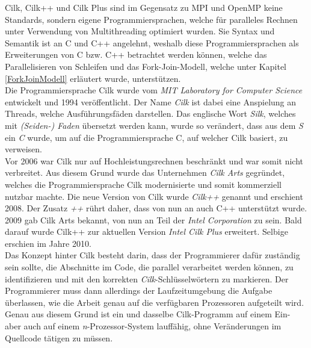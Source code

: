 			Cilk, Cilk++ und Cilk Plus sind im Gegensatz zu MPI und OpenMP keine Standards, sondern eigene Programmiersprachen, welche für paralleles Rechnen unter Verwendung von Multithreading optimiert wurden. Sie Syntax und Semantik ist an C und C++ angelehnt, weshalb diese Programmiersprachen als Erweiterungen von C bzw. C++ betrachtet werden können, welche das Parallelisieren von Schleifen und das Fork-Join-Modell, welche unter Kapitel \ref{ForkJoinModell} erläutert wurde, unterstützen.\\
			Die Programmiersprache Cilk wurde vom \textit{MIT Laboratory for Computer Science} entwickelt und 1994 veröffentlicht. Der Name \textit{Cilk} ist dabei eine Anspielung an Threads, welche Ausführungsfäden darstellen. Das englische Wort \textit{Silk}, welches mit \textit{(Seiden-) Faden} übersetzt werden kann, wurde so verändert, dass aus dem \textit{S} ein \textit{C} wurde, um auf die Programmiersprache C, auf welcher Cilk basiert, zu verweisen.\\
			Vor 2006 war Cilk nur auf Hochleistungsrechnen beschränkt und war somit nicht verbreitet. Aus diesem Grund wurde das Unternehmen \textit{Cilk Arts} gegründet, welches die Programmiersprache Cilk modernisierte und somit kommerziell nutzbar machte. Die neue Version von Cilk wurde \textit{Cilk++} genannt und erschient 2008. Der Zusatz \textit{++} rührt daher, dass von nun an auch C++ unterstützt wurde.\\
			2009 gab Cilk Arts bekannt, von nun an Teil der \textit{Intel Corporation} zu sein. Bald darauf wurde Cilk++ zur aktuellen Version \textit{Intel Cilk Plus} erweitert. Selbige erschien im Jahre 2010.\\
			Das Konzept hinter Cilk besteht darin, dass der Programmierer dafür zuständig sein sollte, die Abschnitte im Code, die parallel verarbeitet werden können, zu identifizieren und mit den korrekten \textit{Cilk}-Schlüsselwörtern zu markieren. Der Programmierer muss dann allerdings der Laufzeitumgebung die Aufgabe überlassen, wie die Arbeit genau auf die verfügbaren Prozessoren aufgeteilt wird. Genau aus diesem Grund ist ein und dasselbe Cilk-Programm auf einem Ein- aber auch auf einem \textit{n}-Prozessor-System lauffähig, ohne Veränderungen im Quellcode tätigen zu müssen.\\
